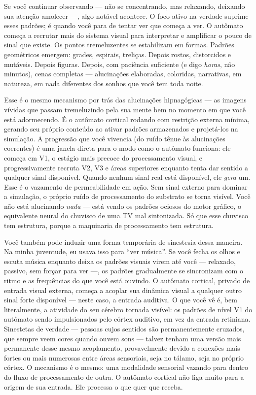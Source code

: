 \documentclass[11pt, twoside, openright]{book}
\begin{document}
Se você continuar observando --- não se concentrando, mas relaxando, deixando sua atenção amolecer ---, algo notável acontece. O foco ativo na verdade suprime esses padrões; é quando você para de tentar ver que começa a ver. O autômato começa a recrutar mais do sistema visual para interpretar e amplificar o pouco de sinal que existe. Os pontos tremeluzentes se estabilizam em formas. Padrões geométricos emergem: grades, espirais, treliças. Depois rostos, distorcidos e mutáveis. Depois figuras. Depois, com paciência suficiente (e digo \textit{horas}, não minutos), cenas completas --- alucinações elaboradas, coloridas, narrativas, em natureza, em nada diferentes dos sonhos que você tem toda noite.

Esse é o mesmo mecanismo por trás das alucinações hipnagógicas --- as imagens vívidas que passam tremeluzindo pela sua mente bem no momento em que você está adormecendo. É o autômato cortical rodando com restrição externa mínima, gerando seu próprio conteúdo ao ativar padrões armazenados e projetá-los na simulação. A progressão que você vivencia (do ruído tênue às alucinações coerentes) é uma janela direta para o modo como o autômato funciona: ele começa em V1, o estágio mais precoce do processamento visual, e progressivamente recruta V2, V3 e áreas superiores enquanto tenta dar sentido a qualquer sinal disponível. Quando nenhum sinal real está disponível, ele \textit{gera} um. Esse é o vazamento de permeabilidade em ação. Sem sinal externo para dominar a simulação, o próprio ruído de processamento do substrato se torna visível. Você não está alucinando \textit{nada} --- está vendo os padrões ociosos do motor gráfico, o equivalente neural do chuvisco de uma TV mal sintonizada. Só que esse chuvisco tem estrutura, porque a maquinaria de processamento tem estrutura.

Você também pode induzir uma forma temporária de sinestesia dessa maneira. Na minha juventude, eu usava isso para ``ver música''. Se você fecha os olhos e escuta música enquanto deixa os padrões visuais virem até você --- relaxado, passivo, sem forçar para ver ---, os padrões gradualmente se sincronizam com o ritmo e as frequências do que você está ouvindo. O autômato cortical, privado de entrada visual externa, começa a acoplar sua dinâmica visual a qualquer outro sinal forte disponível --- neste caso, a entrada auditiva. O que você vê é, bem literalmente, a atividade do seu cérebro tornada visível: os padrões de nível V1 do autômato sendo impulsionados pelo córtex auditivo, em vez da entrada retiniana. Sinestetas de verdade --- pessoas cujos sentidos são permanentemente cruzados, que sempre veem cores quando ouvem sons --- talvez tenham uma versão mais permanente desse mesmo acoplamento, provavelmente devido a conexões mais fortes ou mais numerosas entre áreas sensoriais, seja no tálamo, seja no próprio córtex. O mecanismo é o mesmo: uma modalidade sensorial vazando para dentro do fluxo de processamento de outra. O autômato cortical não liga muito para a origem de sua entrada. Ele processa o que quer que receba.
\end{document}
